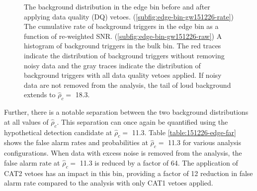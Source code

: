 \begin{figure}[!ht]%
\centering
  \caption[Edge bin histograms - GW151226 analysis]{The background distribution in the edge bin before and after applying data quality (DQ) vetoes. %
           (\ref{subfig:edge-bin-gw151226-rate}) The cumulative rate of background triggers %
           in the edge bin as a function of re-weighted SNR. %
           (\ref{subfig:edge-bin-gw151226-raw}) A histogram of background triggers %
           in the bulk bin. %
           The red traces indicate the distribution of background triggers without %
           removing noisy data and the gray traces indicate the distribution %
           of background triggers with all data quality vetoes applied. %
           If noisy data are not removed from the analysis, the tail of loud background  %
           extends to $\hat{\rho}_{c} =$ 18.3.
          }
\label{fig:edge-bin-far-GW151226}
\end{figure}

Further, there is a notable separation between the two background distributions at all
values of $\hat{\rho}_{c}$. This separation can once again be quantified using the
hypothetical detection candidate at $\hat{\rho}_{c} =$ 11.3. Table \ref{table:151226-edge-far}
shows the false alarm rates and probabilities at $\hat{\rho}_{c} =$ 11.3 for various
analysis configurations. When data with excess noise is removed from the analysis, the false
alarm rate at $\hat{\rho}_{c} =$ 11.3 is reduced by a factor of 64.
The application of CAT2 vetoes has an impact in this bin, providing a factor
of 12 reduction in false alarm rate compared to the analysis with only CAT1 vetoes applied.

